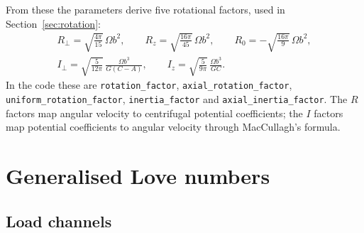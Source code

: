 \documentclass[11pt,a4paper]{article}
\newcommand{\code}[1]{\texttt{#1}}
\numberwithin{equation}{section}
\begin{document}
From these the parameters derive five rotational factors, used in
Section~\ref{sec:rotation}:
\begin{gather}
R_{\perp} = \sqrt{\frac{4\pi}{15}}\,\Omega b^{2},\qquad
R_{z} = \sqrt{\frac{16\pi}{45}}\,\Omega b^{2},\qquad
R_{0} = -\sqrt{\frac{16\pi}{9}}\,\Omega b^{2},
\label{eq:rotfactors}\\
I_{\perp} = \sqrt{\frac{5}{12\pi}}\,\frac{\Omega b^{3}}{G(C-A)},\qquad
I_{z} = \sqrt{\frac{5}{9\pi}}\,\frac{\Omega b^{3}}{GC}.
\label{eq:inertiafactors}
\end{gather}
In the code these are \code{rotation\_factor}, \code{axial\_rotation\_factor},
\code{uniform\_rotation\_factor}, \code{inertia\_factor} and
\code{axial\_inertia\_factor}. The $R$ factors map angular velocity to
centrifugal potential coefficients; the $I$ factors map potential coefficients
to angular velocity through MacCullagh's formula.

\section{Generalised Love numbers}
\label{sec:love}

\subsection{Load channels}
\end{document}
